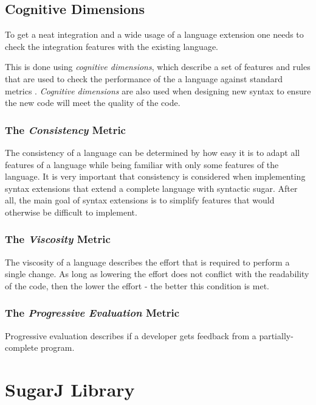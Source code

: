 \documentclass{report}
\begin{document}
\subsection{Cognitive Dimensions}
\label{backgroundCognitiveDimensions}

To get a neat integration and a wide usage of a language extension one needs to check the integration features with the existing language.

This is done using \emph{cognitive dimensions}, which describe a set of features and rules that are used to check the performance of the a language against standard metrics \cite{Green-Cognitive-1996}. \emph{Cognitive dimensions} are also used when designing new syntax to ensure the new code will meet the quality of the code.

\subsubsection*{The \emph{Consistency} Metric}

The consistency of a language can be determined by how easy it is to adapt all features of a language while being familiar with only some features of the language. It is very important that consistency is considered when implementing syntax extensions that extend a complete language with syntactic sugar. After all, the main goal of syntax extensions is to simplify features that would otherwise be difficult to implement.


\subsubsection*{The \emph{Viscosity} Metric}

The viscosity of a language describes the effort that is required to perform a single change. As long as lowering the effort does not conflict with the readability of the code, then the lower the effort - the better this condition is met.


\subsubsection*{The \emph{Progressive Evaluation} Metric}

Progressive evaluation describes if a developer gets feedback from a partially-complete program.


\section{SugarJ Library}
\end{document}
